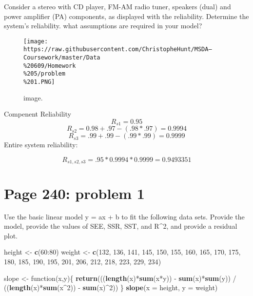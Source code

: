 \documentclass[]{article}
\newenvironment{Shaded}{\begin{snugshade}}{\end{snugshade}}
\newcommand{\KeywordTok}[1]{\textcolor[rgb]{0.13,0.29,0.53}{\textbf{{#1}}}}
\newcommand{\DataTypeTok}[1]{\textcolor[rgb]{0.13,0.29,0.53}{{#1}}}
\newcommand{\DecValTok}[1]{\textcolor[rgb]{0.00,0.00,0.81}{{#1}}}
\newcommand{\StringTok}[1]{\textcolor[rgb]{0.31,0.60,0.02}{{#1}}}
\newcommand{\NormalTok}[1]{{#1}}
\begin{document}
Consider a stereo with CD player, FM-AM radio tuner, speakers (dual) and
power amplifier (PA) components, as displayed with the reliability.
Determine the system's reliability. what assumptions are required in
your model?

\begin{figure}[htbp]
\centering
\texttt{[image: https://raw.githubusercontent.com/ChristopheHunt/MSDA---Coursework/master/Data\\\%20609/Homework\\\%205/problem\\\%201.PNG]}
\caption{image.}
\end{figure}

Compenent Reliability \[R_{s1} = 0.95\]
\[R_{s2} = 0.98 + .97 - (.98 * .97) = 0.9994\]
\[R_{s3} = .99 + .99 - (.99 * .99) = 0.9999\] Entire system reliability:

\[R_{s1, s2, s3} = .95 * 0.9994 * 0.9999 = 0.9493351\]

\section{Page 240: problem 1}\label{page-240-problem-1}

Use the basic linear model y = ax + b to fit the following data sets.
Provide the model, provide the values of SEE, SSR, SST, and R\^{}2, and
provide a residual plot.

\begin{Shaded}
\begin{Highlighting}[]
\NormalTok{height <-}\StringTok{ }\KeywordTok{c}\NormalTok{(}\DecValTok{60}\NormalTok{:}\DecValTok{80}\NormalTok{)}
\NormalTok{weight <-}\StringTok{ }\KeywordTok{c}\NormalTok{(}\DecValTok{132}\NormalTok{, }\DecValTok{136}\NormalTok{, }\DecValTok{141}\NormalTok{, }\DecValTok{145}\NormalTok{, }\DecValTok{150}\NormalTok{, }\DecValTok{155}\NormalTok{, }\DecValTok{160}\NormalTok{, }\DecValTok{165}\NormalTok{, }\DecValTok{170}\NormalTok{, }
            \DecValTok{175}\NormalTok{, }\DecValTok{180}\NormalTok{, }\DecValTok{185}\NormalTok{, }\DecValTok{190}\NormalTok{, }\DecValTok{195}\NormalTok{, }\DecValTok{201}\NormalTok{, }\DecValTok{206}\NormalTok{, }\DecValTok{212}\NormalTok{, }\DecValTok{218}\NormalTok{, }
            \DecValTok{223}\NormalTok{, }\DecValTok{229}\NormalTok{, }\DecValTok{234}\NormalTok{)}
\end{Highlighting}
\end{Shaded}

\begin{Shaded}
\begin{Highlighting}[]
\NormalTok{slope <-}\StringTok{ }\NormalTok{function(x,y)\{}
\KeywordTok{return}\NormalTok{(((}\KeywordTok{length}\NormalTok{(x)*}\KeywordTok{sum}\NormalTok{(x*y)) -}\StringTok{ }\KeywordTok{sum}\NormalTok{(x)*}\KeywordTok{sum}\NormalTok{(y)) /}\StringTok{ }
\StringTok{       }\NormalTok{((}\KeywordTok{length}\NormalTok{(x)*}\KeywordTok{sum}\NormalTok{(x^}\DecValTok{2}\NormalTok{)) -}\StringTok{ }\KeywordTok{sum}\NormalTok{(x)^}\DecValTok{2}\NormalTok{))}
     \NormalTok{\}}
\KeywordTok{slope}\NormalTok{(}\DataTypeTok{x =} \NormalTok{height, }\DataTypeTok{y =} \NormalTok{weight)}
\end{Highlighting}
\end{Shaded}
\end{document}
